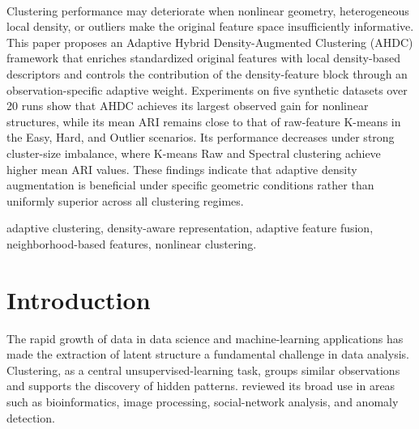 \documentclass[10pt,twoside]{article}
\numberwithin{equation}{section}
\begin{document}

\\

Clustering performance may deteriorate when nonlinear geometry, heterogeneous local density, or outliers make the original feature space insufficiently informative. This paper proposes an Adaptive Hybrid Density-Augmented Clustering (AHDC) framework that enriches standardized original features with local density-based descriptors and controls the contribution of the density-feature block through an observation-specific adaptive weight. Experiments on five synthetic datasets over 20 runs show that AHDC achieves its largest observed gain for nonlinear structures, while its mean ARI remains close to that of raw-feature K-means in the Easy, Hard, and Outlier scenarios. Its performance decreases under strong cluster-size imbalance, where K-means Raw and Spectral clustering achieve higher mean ARI values. These findings indicate that adaptive density augmentation is beneficial under specific geometric conditions rather than uniformly superior across all clustering regimes.



adaptive clustering, density-aware representation, adaptive feature fusion, neighborhood-based features, nonlinear clustering.





\section{Introduction}

The rapid growth of data in data science and machine-learning applications has made the extraction of latent structure a fundamental challenge in data analysis. Clustering, as a central unsupervised-learning task, groups similar observations and supports the discovery of hidden patterns. \cite{XuWunsch2005} reviewed its broad use in areas such as bioinformatics, image processing, social-network analysis, and anomaly detection.
\end{document}
